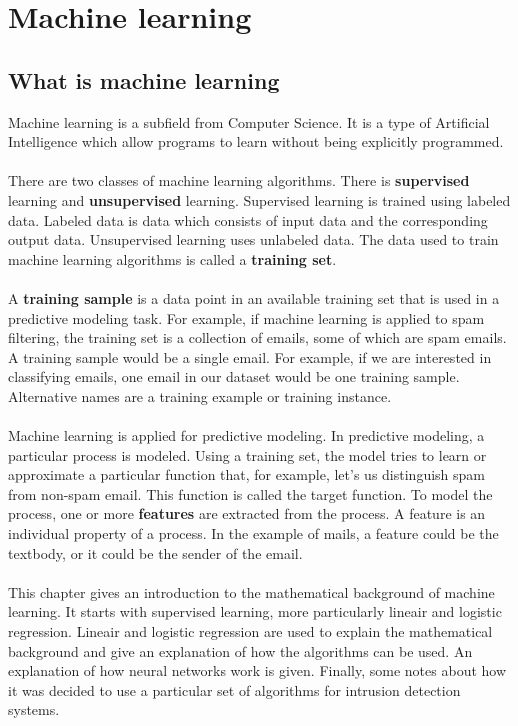 
\chapter{Machine learning} %

\label{Chapter2} %

\section{What is machine learning}
Machine learning is a subfield from Computer Science. It is a type of Artificial Intelligence which allow programs to learn without being explicitly programmed. \cite{coursera} \\
\\
There are two classes of machine learning algorithms. There is \textbf{supervised} learning and \textbf{unsupervised} learning. Supervised learning is trained using labeled data. Labeled data is data which consists of input data and the corresponding output data. Unsupervised learning uses unlabeled data. The data used to train machine learning algorithms is called a \textbf{training set}.\\
\\
A \textbf{training sample} is a data point in an available training set that is used in a predictive modeling task. For example, if machine learning is applied to spam filtering, the training set is a collection of emails, some of which are spam emails. A training sample would be a single email. For example, if we are interested in classifying emails, one email in our dataset would be one training sample. Alternative names are a training example or training instance. \\
\\
Machine learning is applied for predictive modeling. In predictive modeling, a particular process is modeled. Using a training set, the model tries to learn or approximate a particular function that, for example, let's us distinguish spam from non-spam email. This function is called the target function. To model the process, one or more \textbf{features} are extracted from the process. A feature is an individual property of a process. In the example of mails, a feature could be the textbody, or it could be the sender of the email.\\\\
This chapter gives an introduction to the mathematical background of machine learning. It starts with supervised learning, more particularly lineair and logistic regression. Lineair and logistic regression are used to explain the mathematical background and give an explanation of how the algorithms can be used. An explanation of how neural networks work is given. Finally, some notes about how it was decided to use a particular set of algorithms for intrusion detection systems.
